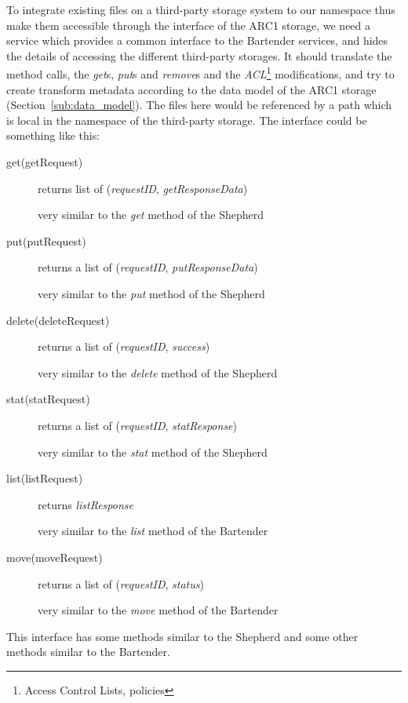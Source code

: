 \documentclass{book}
\begin{document}
To integrate existing files on a third-party storage system to our namespace thus make them accessible through the interface of the ARC1 storage, we need a service which provides a common interface to the Bartender services, and hides the details of accessing the different third-party storages. It should translate the method calls, the \emph{get}s, \emph{put}s and \emph{remove}s and the \emph{ACL}\footnote{Access Control Lists, policies} modifications, and try to create transform metadata according to the data model of the ARC1 storage (Section~\ref{sub:data_model}). The files here would be referenced by a path which is local in the namespace of the third-party storage. The interface could be something like this:
\begin{description}
    \item[get(getRequest)] returns list of (\emph{requestID}, \emph{getResponseData})

    very similar to the \emph{get} method of the Shepherd

    \item[put(putRequest)] returns a list of (\emph{requestID}, \emph{putResponseData})

    very similar to the \emph{put} method of the Shepherd

    \item[delete(deleteRequest)] returns a list of (\emph{requestID}, \emph{success})

    very similar to the \emph{delete} method of the Shepherd

    \item[stat(statRequest)] returns a list of (\emph{requestID}, \emph{statResponse})

    very similar to the \emph{stat} method of the Shepherd

    \item[list(listRequest)] returns \emph{listResponse}

    very similar to the \emph{list} method of the Bartender

    \item[move(moveRequest)] returns a list of (\emph{requestID}, \emph{status})

    very similar to the \emph{move} method of the Bartender

\end{description}
This interface has some methods similar to the Shepherd and some other methods similar to the Bartender.


% 
\end{document}
